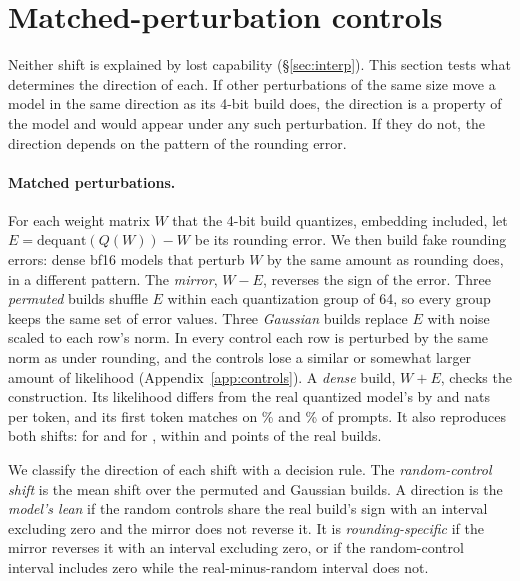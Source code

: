 \section{Matched-perturbation controls}
\label{sec:controls}

Neither shift is explained by lost capability (\S\ref{sec:interp}). This section tests what determines the direction of each. If other perturbations of the same size move a model in the same direction as its 4-bit build does, the direction is a property of the model and would appear under any such perturbation. If they do not, the direction depends on the pattern of the rounding error.

\paragraph{Matched perturbations.}
For each weight matrix $W$ that the 4-bit build quantizes, embedding included, let $E = \mathrm{dequant}(Q(W)) - W$ be its rounding error. We then build fake rounding errors: dense bf16 models that perturb $W$ by the same amount as rounding does, in a different pattern. The \emph{mirror}, $W - E$, reverses the sign of the error. Three \emph{permuted} builds shuffle $E$ within each quantization group of 64, so every group keeps the same set of error values. Three \emph{Gaussian} builds replace $E$ with noise scaled to each row's norm. In every control each row is perturbed by the same norm as under rounding, and the controls lose a similar or somewhat larger amount of likelihood (Appendix~\ref{app:controls}). A \emph{dense} build, $W + E$, checks the construction. Its likelihood differs from the real quantized model's by  and  nats per token, and its first token matches on \% and \% of prompts. It also reproduces both shifts: \pp{}  for \qwen{} and \pp{}  for \llama, within  and  points of the real builds.

We classify the direction of each shift with a decision rule. The \emph{random-control shift} is the mean shift over the permuted and Gaussian builds. A direction is the \emph{model's lean} if the random controls share the real build's sign with an interval excluding zero and the mirror does not reverse it. It is \emph{rounding-specific} if the mirror reverses it with an interval excluding zero, or if the random-control interval includes zero while the real-minus-random interval does not.

